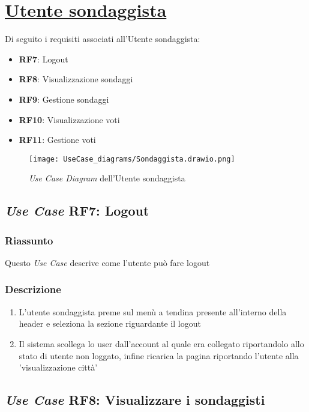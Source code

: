 \section{\underline{Utente sondaggista}}
    Di seguito i requisiti associati all'Utente sondaggista:
    \begin{itemize}
        \item \textbf{RF7}: Logout
        \item \textbf{RF8}: Visualizzazione sondaggi
        \item \textbf{RF9}: Gestione sondaggi
        \item \textbf{RF10}: Visualizzazione voti
        \item \textbf{RF11}: Gestione voti
    \end{itemize}
    \begin{figure}[H]
        \centering
        \texttt{[image: UseCase\_diagrams/Sondaggista.drawio.png]}
        \caption{\textit{Use Case Diagram} dell'Utente sondaggista}
    \end{figure}

    \subsection{\textit{Use Case} RF7: Logout}
        \subsubsection{Riassunto}
            Questo \textit{Use Case} descrive come l'utente può fare logout
        \subsubsection{Descrizione}
            \begin{enumerate}
                \item L'utente sondaggista preme sul menù a tendina presente all'interno della header e seleziona la sezione riguardante il logout
                \item Il sistema scollega lo user dall'account al quale era collegato riportandolo allo stato di utente non loggato, infine 
                ricarica la pagina riportando l'utente alla 'visualizzazione città'
            \end{enumerate}

    \subsection{\textit{Use Case} RF8: Visualizzare i sondaggisti}

